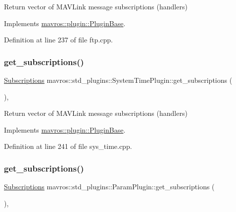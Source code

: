 Return vector of M\+A\+V\+Link message subscriptions (handlers) 



Implements \mbox{\hyperlink{group__plugin_gaf4e23fec6d7436a62cbf0942a2e5791c}{mavros\+::plugin\+::\+Plugin\+Base}}.



Definition at line 237 of file ftp.\+cpp.

\mbox{\label{group__plugin_gab01303b0702a925da36b38cb1d1a1d45}} 
\subsubsection{\texorpdfstring{get\_subscriptions()}{get\_subscriptions()}\hspace{0.1cm}{\footnotesize\ttfamily [39/41]}}
{\footnotesize\ttfamily \mbox{\hyperlink{group__plugin_ga8967d61fc77040e0c3ea5a4585d62a09}{Subscriptions}} mavros\+::std\+\_\+plugins\+::\+System\+Time\+Plugin\+::get\+\_\+subscriptions (\begin{DoxyParamCaption}{ }\end{DoxyParamCaption})\hspace{0.3cm}{\ttfamily [inline]}, {\ttfamily [virtual]}}



Return vector of M\+A\+V\+Link message subscriptions (handlers) 



Implements \mbox{\hyperlink{group__plugin_gaf4e23fec6d7436a62cbf0942a2e5791c}{mavros\+::plugin\+::\+Plugin\+Base}}.



Definition at line 241 of file sys\+\_\+time.\+cpp.

\mbox{\label{group__plugin_gac1471c7f06987a6ca0b199634a80f22b}} 
\subsubsection{\texorpdfstring{get\_subscriptions()}{get\_subscriptions()}\hspace{0.1cm}{\footnotesize\ttfamily [40/41]}}
{\footnotesize\ttfamily \mbox{\hyperlink{group__plugin_ga8967d61fc77040e0c3ea5a4585d62a09}{Subscriptions}} mavros\+::std\+\_\+plugins\+::\+Param\+Plugin\+::get\+\_\+subscriptions (\begin{DoxyParamCaption}{ }\end{DoxyParamCaption})\hspace{0.3cm}{\ttfamily [inline]}, {\ttfamily [virtual]}}




